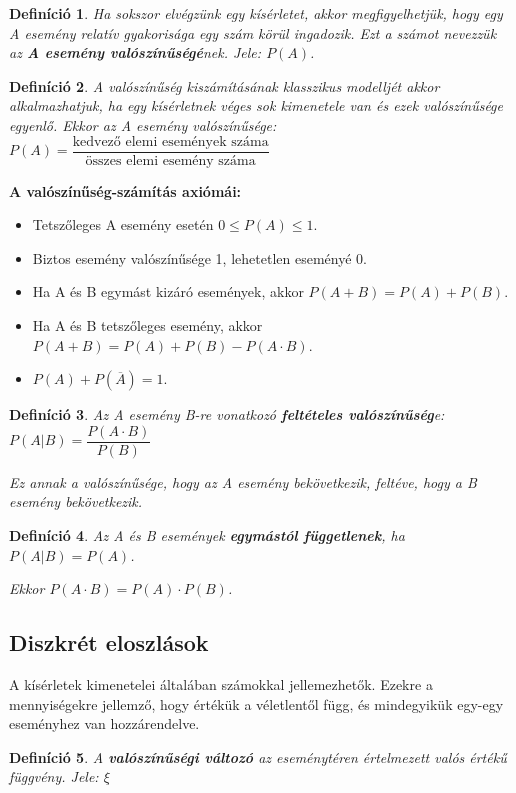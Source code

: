 \documentclass[12pt,a4paper]{article}
\newtheorem{definition}{Definíció} [section]
\begin{document}
\begin{definition}
Ha sokszor elvégzünk egy kísérletet, akkor megfigyelhetjük, hogy egy A esemény relatív gyakorisága egy szám körül ingadozik. Ezt a számot nevezzük az \textbf{A esemény valószínűségé}nek. Jele: $P(A)$.
\end{definition}

\begin{definition}
A valószínűség kiszámításának klasszikus modelljét akkor alkalmazhatjuk, ha egy kísérletnek véges sok kimenetele van és ezek valószínűsége egyenlő. Ekkor az A esemény valószínűsége: $P(A)=\dfrac{\text{kedvező elemi események száma}}{\text{összes elemi esemény száma}}$
\end{definition}

\textbf{A valószínűség-számítás axiómái:}
\begin{itemize}
\item Tetszőleges A esemény esetén $0\leq P(A)\leq 1$.
\item Biztos esemény valószínűsége 1, lehetetlen eseményé 0.
\item Ha A és B egymást kizáró események, akkor $P(A+B)=P(A)+P(B)$.
\item  Ha A és B tetszőleges esemény, akkor $P(A+B)=P(A)+P(B)-P(A\cdot B)$.
\item $P(A)+P(\overline{A})=1$.
\end{itemize}

\begin{definition}
Az A esemény B-re vonatkozó \textbf{feltételes valószínűség}e: $P(A|B)=\dfrac{P(A\cdot B)}{P(B)}$

Ez annak a valószínűsége, hogy az A esemény bekövetkezik, feltéve, hogy a B esemény bekövetkezik.
\end{definition}

\begin{definition}
Az A és B események \textbf{egymástól függetlenek}, ha $P(A|B)=P(A)$.

Ekkor $P(A\cdot B)=P(A)\cdot P(B)$.
\end{definition}

\subsection{Diszkrét eloszlások}
A kísérletek kimenetelei általában számokkal jellemezhetők. Ezekre a mennyiségekre jellemző, hogy értékük a véletlentől függ, és mindegyikük egy-egy eseményhez van hozzárendelve.
\begin{definition}
A \textbf{valószínűségi változó} az eseménytéren értelmezett valós értékű függvény. Jele: $\xi$
\end{definition}
\end{document}
